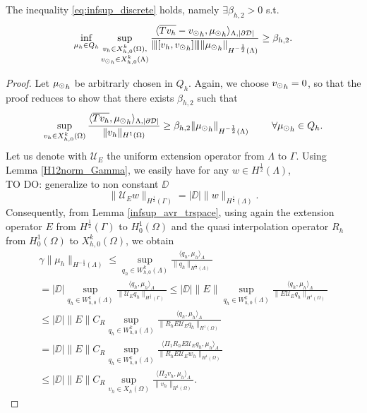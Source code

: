 \begin{theorem} The inequality \eqref{eq:infsup_discrete} holds, namely 
$\exists \beta_{h,2} >0$ s.t.
\begin{equation}
\inf_{\mu_h \in Q_h} 
\sup_{\substack{v_h \in X_{h,0}^k(\Omega),\\ {v_{\odot}}_h \in X_{h,0}^k(\Lambda)} }\frac{\langle \overline{Tv_h} -  {v_{\odot}}_h, {\mu_{\odot}}_h \rangle _{\Lambda,|\partial\mathcal{D}|} } {{\left\vert\kern-0.25ex\left\vert\kern-0.25ex\left\vert [v_h, {v_{\odot}}_h] \right\vert\kern-0.25ex\right\vert\kern-0.25ex\right\vert} \|{\mu_{\odot}}_h\|_{H^{-\frac 12 }(\Lambda)} } 
\geq \beta_{h,2}. 
\end{equation}
\end{theorem}
\begin{proof}
Let ${\mu_{\odot}}_h$ be arbitrarly chosen in $Q_h$. Again, we choose ${v_{\odot}}_h =0$, so that the proof reduces to show that there exists $\beta_{h,2}$ such that
\begin{equation*}
\sup_{v_h \in X_{h,0}^k(\Omega)} \frac{ \langle \overline{T v_h} , {\mu_{\odot}}_h \rangle _{\Lambda,|\partial\mathcal{D}|} } {\|v_h\|_{H^1(\Omega)} }\geq \beta_{h,2} \|{\mu_{\odot}}_h\|_{H^{-\frac 12}(\Lambda)}\ \qquad \forall {\mu_{\odot}}_h \in Q_h.
\end{equation*}
Let us denote with $\mathcal{U}_E$ the uniform extension operator from $\Lambda$ to $\Gamma$. Using Lemma \ref{H12norm_Gamma}, we easily have for any $w \in H^{\frac 12}(\Lambda)$,\\
{\color{red} TO DO: generalize to non constant $\DD$}
\begin{equation*}
\|\mathcal{U}_E w\|_{H^{\frac 12}(\Gamma)}=|\DD| \|w\|_{H^{\frac 12}(\Lambda)}.
\end{equation*}
Consequently, from Lemma \ref{infsup_avr_trspace}, using again the extension operator $E$ from $H^{\frac 12}(\Gamma)$ to $H^1_0(\Omega)$ and the quasi interpolation operator $R_h$ from $H^1_0(\Omega)$ to $X_{h,0}^k(\Omega)$, we obtain
\begin{multline}
\gamma \|\mu_h\|_{H^{-\frac 12}(\Lambda)} \leq 
\sup_{q_h \in W_{h,0}^k(\Lambda)} \frac{ \langle q_h, \mu_h \rangle_{\Lambda} } {\|q_h\|_{H^{\frac 12}(\Lambda)}} 
\\
= |\DD| \sup_{q_h \in W_{h,0}^k(\Lambda)} \frac{ \langle q_h, \mu_h \rangle _{\Lambda}} {\|\mathcal{U}_E q_h\|_{H^{\frac 12}(\Gamma)}} 
\leq |\DD|\|E\| \sup_{q_h \in W_{h,0}^k(\Lambda)} \frac{ \langle q_h, \mu_h \rangle _{\Lambda} } {\|E \mathcal{U}_E q_h\|_{H^1(\Omega)}} 
\\
\leq |\DD|\|E\| C_R \sup_{q_h \in W_{h,0}^k(\Lambda)} \frac{ \langle q_h, \mu_h \rangle _{\Lambda} } {\|R_h E \mathcal{U}_E q_h\|_{H^1(\Omega)}}
\\ 
=  |\DD|\|E\| C_R \sup_{q_h \in W_{h,0}^k(\Lambda)} \frac{ \langle \Pi _1  R_h E \mathcal{U}_E q_h, \mu_h \rangle _{\Lambda}} {\|R_h E \mathcal{U}_E w_h\|_{H^1(\Omega)}}
\\
\leq |\DD|\|E\| C_R \sup_{v_h \in X_h(\Omega)} \frac{ \langle \Pi _2  v_h, \mu_h \rangle _{\Lambda}} {\|v_h\|_{H^1(\Omega)}}. 
\end{multline}


\end{proof}
